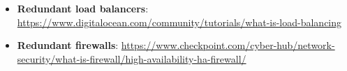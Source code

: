 \begin{itemize}
    \item \textbf{Redundant load balancers}: \url{https://www.digitalocean.com/community/tutorials/what-is-load-balancing}
    \item \textbf{Redundant firewalls}: \url{https://www.checkpoint.com/cyber-hub/network-security/what-is-firewall/high-availability-ha-firewall/}
\end{itemize}